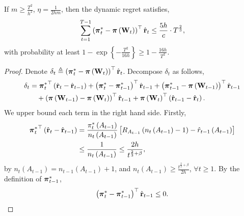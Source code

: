 \begin{thm}
\label{thm:dynamic_regret_sublinear}
    If $m \ge \frac{T^2}{h^2}$, $\eta = \frac{1}{2 h m}$, then the dynamic regret satisfies,
\begin{equation*}
\begin{split}
    \sum\limits_{t=1}^{T-1}{ \left(  {{\boldsymbol{\pi}}_t^*} - {\boldsymbol{\pi}}\left( {\mathbf{W}}_t \right) \right)^\top \hat{{\mathbf{r}}}_t } \le \frac{5 h}{c} \cdot  T^{\frac{2}{3}},
\end{split}
\end{equation*}
with probability at least $1 - \exp\left\{ - \frac{T^2}{16 h} \right\} \ge 1 - \frac{16 h}{T^2}$.
\end{thm}
\begin{proof}
    Denote $\delta_t \triangleq \left( {{\boldsymbol{\pi}}_t^*} - {\boldsymbol{\pi}}\left( {\mathbf{W}}_t \right) \right)^\top \hat{{\mathbf{r}}}_t$. Decompose $\delta_t$ as follows,
\begin{equation}
\label{eq:dynamic_regret_decomposition}
\begin{split}
    \delta_t &= {{\boldsymbol{\pi}}_t^*}^\top \left( \hat{{\mathbf{r}}}_t - \hat{{\mathbf{r}}}_{t-1}\right) + \left( {{\boldsymbol{\pi}}_t^*} - {{\boldsymbol{\pi}}_{t-1}^*} \right)^\top \hat{{\mathbf{r}}}_{t-1}  + \left( {{\boldsymbol{\pi}}_{t-1}^*} - {\boldsymbol{\pi}}\left( {\mathbf{W}}_{t-1} \right) \right)^\top \hat{{\mathbf{r}}}_{t-1} \\
    &\quad + \left(  {\boldsymbol{\pi}}\left( {\mathbf{W}}_{t-1} \right) - {\boldsymbol{\pi}}\left( {\mathbf{W}}_t \right) 
    \right)^\top \hat{{\mathbf{r}}}_{t-1} + {\boldsymbol{\pi}}\left( {\mathbf{W}}_t \right)^\top \left( \hat{{\mathbf{r}}}_{t-1} - \hat{{\mathbf{r}}}_t \right).
\end{split}
\end{equation}
We upper bound each term in the right hand side. Firstly,
\begin{equation*}
\begin{split}
    {{\boldsymbol{\pi}}_t^*}^\top \left( \hat{{\mathbf{r}}}_t - \hat{{\mathbf{r}}}_{t-1}\right) &= \frac{\pi_{t}^*\left(A_{t-1}\right)}{n_{t}\left(A_{t-1}\right)} \left[ R_{ A_{t-1}}\left( n_{t}\left(A_{t-1}\right) -1 \right) - \hat{r}_{t-1}\left(A_{t-1}\right) \right] \\
    &\le \frac{1}{n_{t}\left(A_{t-1}\right)} \le \frac{ 2 h }{t^{\frac{2}{3} + \beta}},
\end{split}
\end{equation*}
by $n_{t}\left(A_{t-1}\right) = n_{t-1}\left(A_{t-1}\right) + 1$, and $n_{t}\left(A_{t-1}\right) \ge \frac{t^{\frac{2}{3} + \beta}}{ 2 h }$, $\forall t \ge 1$. By the definition of ${{\boldsymbol{\pi}}_{t-1}^*}$,
\begin{equation*}
    \left( {\rvpi_t^*} - {\rvpi_{t-1}^*} \right)^\top \hat{\rvr}_{t-1} \le 0.

\end{equation*}
\end{proof}
